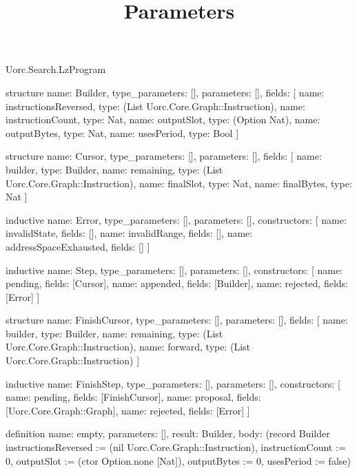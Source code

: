 \begin{lexlean}{Uorc.Search.LzProgram}
\title{Parameters}
\begin{semanticmodule}
structure{
  name: Builder,
  type_parameters: [],
  parameters: [],
  fields: [
    {name: instructionsReversed, type: (List Uorc.Core.Graph::Instruction)},
    {name: instructionCount, type: Nat},
    {name: outputSlot, type: (Option Nat)},
    {name: outputBytes, type: Nat},
    {name: usesPeriod, type: Bool}
  ]
}

structure{
  name: Cursor,
  type_parameters: [],
  parameters: [],
  fields: [
    {name: builder, type: Builder},
    {name: remaining, type: (List Uorc.Core.Graph::Instruction)},
    {name: finalSlot, type: Nat},
    {name: finalBytes, type: Nat}
  ]
}

inductive{
  name: Error,
  type_parameters: [],
  parameters: [],
  constructors: [
    {name: invalidState, fields: []},
    {name: invalidRange, fields: []},
    {name: addressSpaceExhausted, fields: []}
  ]
}

inductive{
  name: Step,
  type_parameters: [],
  parameters: [],
  constructors: [
    {name: pending, fields: [Cursor]},
    {name: appended, fields: [Builder]},
    {name: rejected, fields: [Error]}
  ]
}

structure{
  name: FinishCursor,
  type_parameters: [],
  parameters: [],
  fields: [
    {name: builder, type: Builder},
    {name: remaining, type: (List Uorc.Core.Graph::Instruction)},
    {name: forward, type: (List Uorc.Core.Graph::Instruction)}
  ]
}

inductive{
  name: FinishStep,
  type_parameters: [],
  parameters: [],
  constructors: [
    {name: pending, fields: [FinishCursor]},
    {name: proposal, fields: [Uorc.Core.Graph::Graph]},
    {name: rejected, fields: [Error]}
  ]
}

definition{
  name: empty,
  parameters: [],
  result: Builder,
  body: (record Builder {instructionsReversed := (nil Uorc.Core.Graph::Instruction), instructionCount := 0, outputSlot := (ctor Option.none [Nat]), outputBytes := 0, usesPeriod := false})
}


\end{semanticmodule}
\end{lexlean}
